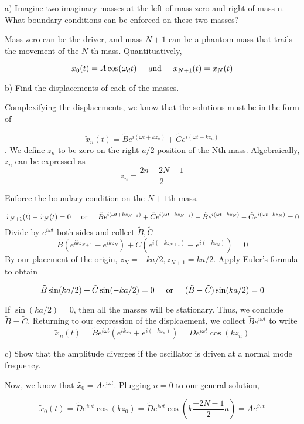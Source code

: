 \documentclass{article}
\newcommand{\textOr}{
    {
        \hspace{5mm}
        \textrm{or}
        \hspace{5mm}
    }
}
\newcommand{\textAnd}{
    {
        \hspace{5mm}
        \textrm{and}
        \hspace{5mm}
    }
}
\newcommand{\Ixp}[1]{
    {
        e^{i{#1}}
    }
}
\begin{document}
\noindent
a) Imagine two imaginary masses at the left of mass zero and right of mass 
n. What boundary conditions can be enforced on these two masses?

Mass zero can be the driver, and mass $N+1$ can be a phantom mass 
that trails the movement of the $N$ th mass. Quantituatively, 

\[
    x_0(t) = A\cos(\omega_d t)
    \textAnd 
    x_{N+1}(t) = x_{N}(t)
\]

\noindent 
b) Find the displacements of each of the masses. 

Complexifying the displacements, we know that the 
solutions must be in the form of 

\[
    \tilde{x}_n(t) = 
    \tilde{B}\Ixp{(\omega t + k z_n)} +
    \tilde{C}\Ixp{(\omega t - k z_n)}
\]. 
We define $z_n$ to be zero on the right $a/2$ position of 
the Nth mass. Algebraically, $z_n$ can be expressed as 
\[
    z_n = \frac{2n - 2N - 1}{2}
\]

Enforce the boundary condition on the $N+1$th mass. 

\[
    \tilde{x}_{N + 1}(t) - \tilde{x}_{N}(t) = 0 
    \textOr 
     \tilde{B}\Ixp{(\omega t + k z_{N + 1})} +
    \tilde{C}\Ixp{(\omega t - k z_{N + 1})}
    -
 \tilde{B}\Ixp{(\omega t + k z_N )} -
    \tilde{C}\Ixp{(\omega t - k z_N)}
    = 0
\]
Divide by $\Ixp{\omega t}$ both sides and collect 
$\tilde{B}, \tilde{C}$
\[
    \tilde{B} (\Ixp{kz_{N + 1}} - \Ixp{kz_{N}})
    + \tilde{C}(
        \Ixp{(-kz_{N + 1})}
    - \Ixp{(-kz_N)}
    )
    = 0
\]
By our placement of the origin, $z_N = -ka/2, z_{N+1} = ka/2$. 
Apply Euler's formula to obtain 

\[
   \tilde{B}\sin(ka/2) + \tilde{C}\sin(-ka/2) = 0 
   \textOr 
   (\tilde{B} - \tilde{C}) \sin(ka/2) = 0
\]

If $\sin(ka/2) = 0$, then all the masses will be stationary. Thus, 
we conclude $\tilde{B} = \tilde{C}$. Returning to our expression of 
the displcaement, we collect $\tilde{B}\Ixp{\omega t}$ to write 
\[
    \boxed{
    \tilde{x}_n(t) = \tilde{B}\Ixp{\omega t} (\Ixp{kz_n} + \Ixp{(-kz_n)})
    = \tilde{D} \Ixp{\omega t}\cos(kz_n)
    }
\]

c) Show that the amplitude diverges if the oscillator 
is driven at a normal mode frequency. 

Now, we know that $\tilde{x_0} = A\Ixp{\omega t}$. Plugging $n = 0$
to our general solution, 

\[
    \tilde{x}_0(t) = \tilde{D}\Ixp{\omega t} \cos(kz_0)
    = \tilde{D}\Ixp{\omega t} \cos(k\frac{- 2N - 1}{2}a) = 
    A\Ixp{\omega t}
\]
\end{document}

